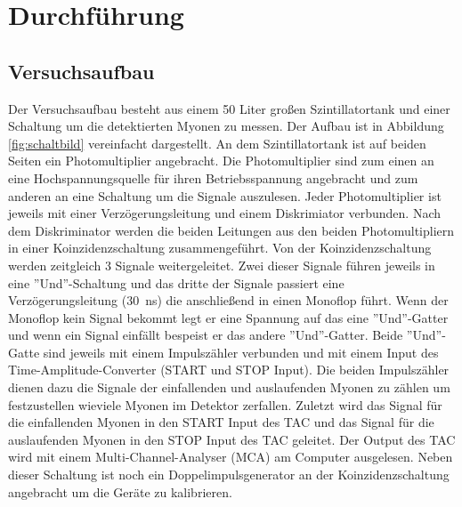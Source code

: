 \section{Durchführung}
\label{sec:Durchfuehrung}
\subsection{Versuchsaufbau}
Der Versuchsaufbau besteht aus einem \num{50} Liter großen Szintillatortank und einer Schaltung um die detektierten Myonen zu messen.
Der Aufbau ist in Abbildung \ref{fig:schaltbild} vereinfacht dargestellt.
An dem Szintillatortank ist auf beiden Seiten ein Photomultiplier angebracht.
Die Photomultiplier sind zum einen an eine Hochspannungsquelle für ihren Betriebsspannung angebracht und zum anderen an eine Schaltung um die Signale auszulesen.
Jeder Photomultiplier ist jeweils mit einer Verzögerungsleitung und einem Diskrimiator verbunden.
Nach dem Diskriminator werden die beiden Leitungen aus den beiden Photomultipliern in einer Koinzidenzschaltung zusammengeführt.
Von der Koinzidenzschaltung werden zeitgleich 3 Signale weitergeleitet.
Zwei dieser Signale führen jeweils in eine ''Und''-Schaltung und das dritte der Signale passiert eine Verzögerungsleitung (\SI{30}{\nano \second}) die anschließend in einen Monoflop führt.
Wenn der Monoflop kein Signal bekommt legt er eine Spannung auf das eine ''Und''-Gatter und wenn ein Signal einfällt bespeist er das andere ''Und''-Gatter.
Beide ''Und''-Gatte sind jeweils mit einem Impulszähler verbunden und mit einem Input des Time-Amplitude-Converter (START und STOP Input).
Die beiden Impulszähler dienen dazu die Signale der einfallenden und auslaufenden Myonen zu zählen um festzustellen wieviele Myonen im Detektor zerfallen.
Zuletzt wird das Signal für die einfallenden Myonen in den START Input des TAC und das Signal für die auslaufenden Myonen in den STOP Input des TAC geleitet.
Der Output des TAC wird mit einem Multi-Channel-Analyser (MCA) am Computer ausgelesen.
Neben dieser Schaltung ist noch ein Doppelimpulsgenerator an der Koinzidenzschaltung angebracht um die Geräte zu kalibrieren.
